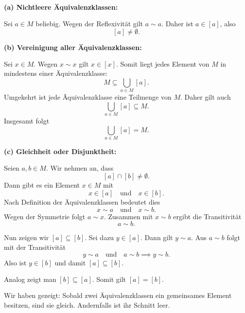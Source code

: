 
\begin{myproof}
  \textbf{(a) Nichtleere Äquivalenzklassen:}

  Sei $a\in M$ beliebig. Wegen der Reflexivität gilt $a\sim a$.
  Daher ist $a\in[a]$, also
  \[
    [a]\neq\emptyset.
  \]

  \textbf{(b) Vereinigung aller Äquivalenzklassen:}

  Sei $x\in M$. Wegen $x\sim x$ gilt $x\in[x]$. Somit liegt
  jedes Element von $M$ in mindestens einer Äquivalenzklasse:
  \[
    M\subseteq\bigcup_{a\in M}[a].
  \]
  Umgekehrt ist jede Äquivalenzklasse eine Teilmenge von $M$.
  Daher gilt auch
  \[
    \bigcup_{a\in M}[a]\subseteq M.
  \]
  Insgesamt folgt
  \[
    \bigcup_{a\in M}[a]=M.
  \]

  \textbf{(c) Gleichheit oder Disjunktheit:}

  Seien $a,b\in M$. Wir nehmen an, dass
  \[
    [a]\cap[b]\neq\emptyset.
  \]
  Dann gibt es ein Element $x\in M$ mit
  \[
    x\in[a]\quad\text{und}\quad x\in[b].
  \]
  Nach Definition der Äquivalenzklassen bedeutet dies
  \[
    x\sim a\quad\text{und}\quad x\sim b.
  \]
  Wegen der Symmetrie folgt $a\sim x$. Zusammen mit $x\sim b$
  ergibt die Transitivität
  \[
    a\sim b.
  \]

  Nun zeigen wir $[a]\subseteq[b]$. Sei dazu $y\in[a]$.
  Dann gilt $y\sim a$. Aus $a\sim b$ folgt mit der
  Transitivität
  \[
    y\sim a\quad\text{und}\quad a\sim b
    \implies y\sim b.
  \]
  Also ist $y\in[b]$ und damit $[a]\subseteq[b]$.

  Analog zeigt man $[b]\subseteq[a]$. Somit gilt
  $[a]=[b]$.

  Wir haben gezeigt: Sobald zwei Äquivalenzklassen ein
  gemeinsames Element besitzen, sind sie gleich. Andernfalls
  ist ihr Schnitt leer.
\end{myproof}

